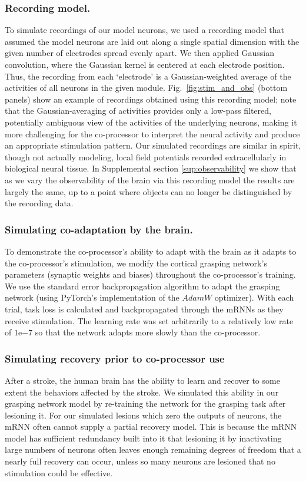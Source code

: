 \documentclass[12pt]{iopart}
\begin{document}
\subsubsection{Recording model.}
To simulate recordings of our model neurons, we used a recording model that assumed the model neurons
are laid out along a single spatial dimension with the given number of electrodes spread evenly apart.
We then applied Gaussian convolution, where the Gaussian kernel is centered at each electrode position.
Thus, the recording from each `electrode' is a Gaussian-weighted average of the activities of all neurons
in the given module. Fig.~\ref{fig:stim_and_obs} (bottom panels) show an example of recordings obtained
using this recording model; note that the Gaussian-averaging of activities provides only a low-pass
filtered, potentially ambiguous view of the activities of the underlying neurons, making it more challenging
for the co-processor to interpret the neural activity and produce an appropriate stimulation pattern. Our
simulated recordings are similar in spirit, though not actually modeling, local field potentials recorded
extracellularly in biological neural tissue. In Supplemental section
\ref{sup:observability} we show that as we vary the observability of the
brain via this recording model the results are largely the same, up to a
point where objects can no longer be distinguished by the recording data.

\subsubsection{Simulating co-adaptation by the brain.}
To demonstrate the co-processor's ability to adapt with the brain as it adapts to the co-processor's
stimulation, we modify the cortical grasping network's parameters (synaptic weights and biases) throughout
the co-processor's training. We use the standard error backpropagation algorithm to adapt the grasping network
(using PyTorch's implementation of the $AdamW$ optimizer). With each trial, task loss is calculated and
backpropagated through the mRNNs as they receive stimulation. The learning rate was set arbitrarily
to a relatively low rate of $1\mathrm{e}{-7}$ so that the network adapts more slowly than the co-processor.

\subsubsection{Simulating recovery prior to co-processor use}
After a stroke, the human brain has the ability to learn and recover to some extent the behaviors
affected by the stroke. We simulated this ability in our grasping network model by re-training the
network for the grasping task after lesioning it. For our simulated lesions which zero
the outputs of neurons, the mRNN often cannot supply a partial recovery model.
This is because the mRNN model has sufficient redundancy built into it that lesioning it by
inactivating large numbers of neurons often leaves enough remaining degrees of freedom that a
nearly full recovery can occur, unless so many neurons are lesioned that no stimulation could be
effective.
\end{document}
